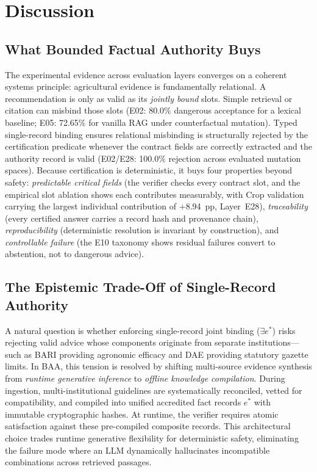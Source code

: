 
\section{Discussion}
\label{sec:discussion}

\subsection{What Bounded Factual Authority Buys}
The experimental evidence across evaluation layers converges on a coherent systems principle: agricultural evidence is fundamentally relational. A recommendation is only as valid as its \emph{jointly bound} slots. Simple retrieval or citation can misbind those slots (E02: 80.0\% dangerous acceptance for a lexical baseline; E05: 72.65\% for vanilla RAG under counterfactual mutation). Typed single-record binding ensures relational misbinding is structurally rejected by the certification predicate whenever the contract fields are correctly extracted and the authority record is valid (E02/E28: 100.0\% rejection across evaluated mutation spaces). Because certification is deterministic, it buys four properties beyond safety: \emph{predictable critical fields} (the verifier checks every contract slot, and the empirical slot ablation shows each contributes measurably, with Crop validation carrying the largest individual contribution of $+$8.94~pp, Layer~E28), \emph{traceability} (every certified answer carries a record hash and provenance chain), \emph{reproducibility} (deterministic resolution is invariant by construction), and \emph{controllable failure} (the E10 taxonomy shows residual failures convert to abstention, not to dangerous advice).

\subsection{The Epistemic Trade-Off of Single-Record Authority}
A natural question is whether enforcing single-record joint binding ($\exists e^*$) risks rejecting valid advice whose components originate from separate institutions---such as BARI providing agronomic efficacy and DAE providing statutory gazette limits. In BAA, this tension is resolved by shifting multi-source evidence synthesis from \emph{runtime generative inference} to \emph{offline knowledge compilation}. During ingestion, multi-institutional guidelines are systematically reconciled, vetted for compatibility, and compiled into unified accredited fact records $e^*$ with immutable cryptographic hashes. At runtime, the verifier requires atomic satisfaction against these pre-compiled composite records. This architectural choice trades runtime generative flexibility for deterministic safety, eliminating the failure mode where an LLM dynamically hallucinates incompatible combinations across retrieved passages.

